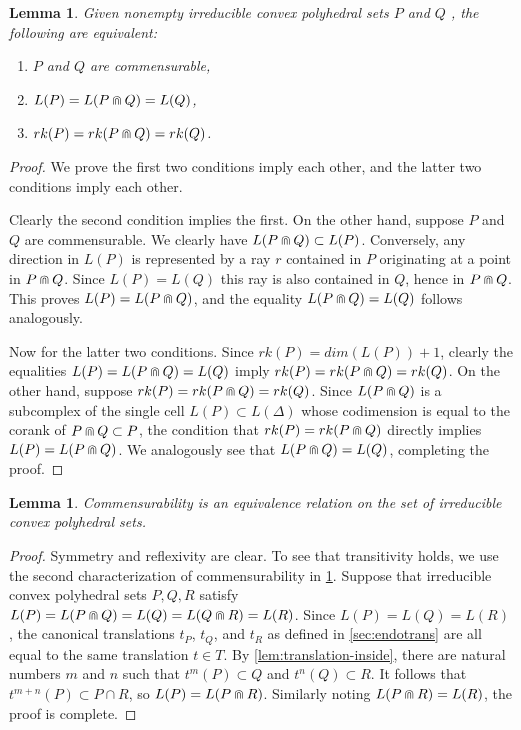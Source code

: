 \documentclass[11pt]{amsart}
\newtheorem{lemma}[theorem]{Lemma}
\numberwithin{table}{section}
\numberwithin{figure}{section}
\theoremstyle{remark}
\begin{document}
\begin{lemma} \label{lem:commens-characterizations}
  Given nonempty irreducible convex polyhedral sets $P$ and $Q$ , the
  following are equivalent:
  \begin{enumerate}
  \item $P$ and $Q$ are commensurable,
  \item $L(P) = L(P\doublecap Q) = L(Q)$,
  \item $rk(P) = rk(P\doublecap Q) = rk(Q)$.
\end{enumerate}
\end{lemma}
\begin{proof}
  We prove the first two conditions imply each other, and the latter
  two conditions imply each other.

  Clearly the second condition implies the first. On the other hand,
  suppose $P$ and $Q$ are commensurable. We clearly have
  $L(P\doublecap Q) \subset L(P)$. Conversely, any direction in $L(P)$
  is represented by a ray $r$ contained in $P$ originating at a point
  in $P\doublecap Q$. Since $L(P) = L(Q)$ this ray is also contained
  in $Q$, hence in $P\doublecap Q$. This proves
  $L(P) = L(P\doublecap Q)$, and the equality
  $L(P\doublecap Q) = L(Q)$ follows analogously.

  Now for the latter two conditions. Since $rk(P) = dim(L(P))+1$,
  clearly the equalities $L(P) = L(P\doublecap Q) = L(Q)$ imply
  $rk(P) = rk(P\doublecap Q) = rk(Q)$. On the other hand, suppose
  $rk(P) = rk(P\doublecap Q) = rk(Q)$. Since $L(P\doublecap Q)$ is a
  subcomplex of the single cell $L(P) \subset L(\Delta)$ whose
  codimension is equal to the corank of $P\doublecap Q \subset P$, the
  condition that $rk(P) = rk(P\doublecap Q)$ directly implies
  $L(P) = L(P\doublecap Q)$. We analogously see that
  $L(P\doublecap Q) = L(Q)$, completing the proof.
\end{proof}

\begin{lemma} \label{lem:comm-equiv-rel}
  Commensurability is an equivalence relation on the set of
  irreducible convex polyhedral sets.
\end{lemma}
\begin{proof}
  Symmetry and reflexivity are clear. To see that transitivity holds,
  we use the second characterization of commensurability in
  \cref{lem:commens-characterizations}.  Suppose that irreducible
  convex polyhedral sets $P,Q,R$ satisfy
  $L(P) = L(P\doublecap Q) =L(Q)= L(Q\doublecap R)= L(R)$. Since
  $L(P)=L(Q)=L(R)$, the canonical translations $t_P$, $t_Q$, and $t_R$
  as defined in \cref{sec:endotrans} are all equal to the same
  translation $t\in T$. By \cref{lem:translation-inside}, there are
  natural numbers $m$ and $n$ such that $t^m(P) \subset Q$ and
  $t^n(Q) \subset R$. It follows that $t^{m+n}(P) \subset P\cap R$, so
  $L(P) = L(P\doublecap R)$. Similarly noting
  $L(P\doublecap R) = L(R)$, the proof is complete.
\end{proof}
\end{document}
